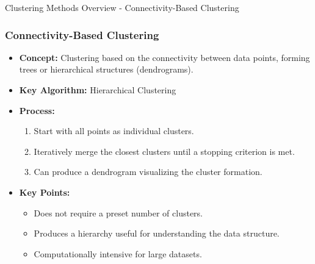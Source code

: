 \documentclass[aspectratio=169]{beamer}
\begin{document}
\begin{frame}[fragile]{Clustering Methods Overview - Connectivity-Based Clustering}
    \frametitle{Connectivity-Based Clustering}
    \begin{itemize}
        \item \textbf{Concept:} Clustering based on the connectivity between data points, forming trees or hierarchical structures (dendrograms).
        \item \textbf{Key Algorithm:} Hierarchical Clustering
        \item \textbf{Process:}
        \begin{enumerate}
            \item Start with all points as individual clusters.
            \item Iteratively merge the closest clusters until a stopping criterion is met.
            \item Can produce a dendrogram visualizing the cluster formation.
        \end{enumerate}
        \item \textbf{Key Points:}
        \begin{itemize}
            \item Does not require a preset number of clusters.
            \item Produces a hierarchy useful for understanding the data structure.
            \item Computationally intensive for large datasets.
        \end{itemize}
    \end{itemize}
\end{frame}
\end{document}
